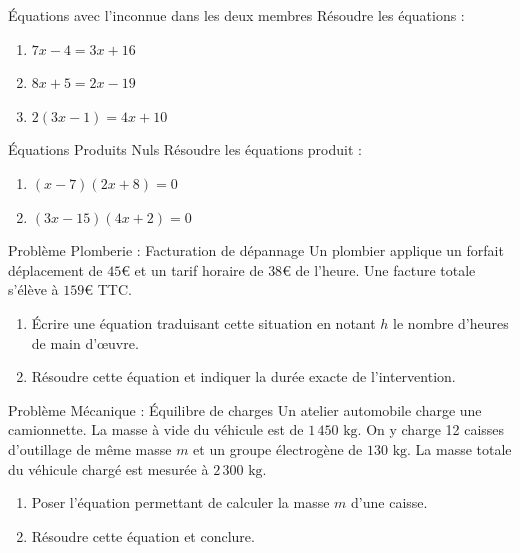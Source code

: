 \begin{exercice}[3 pts]{\capRealiser}{Équations avec l'inconnue dans les deux membres}
Résoudre les équations :
\begin{enumerate}
    \item $7x - 4 = 3x + 16$
    \item $8x + 5 = 2x - 19$
    \item $2(3x - 1) = 4x + 10$
\end{enumerate}
\lignesreponse[6]
\end{exercice}

\begin{exercice}[2 pts]{\capRealiser}{Équations Produits Nuls}
Résoudre les équations produit :
\begin{enumerate}
    \item $(x - 7)(2x + 8) = 0$
    \item $(3x - 15)(4x + 2) = 0$
\end{enumerate}
\lignesreponse[4]
\end{exercice}

\begin{exercice}[3 pts]{\capAnalyser}{Problème Plomberie : Facturation de dépannage}
Un plombier applique un forfait déplacement de $45\euro$ et un tarif horaire de $38\euro$ de l'heure.
Une facture totale s'élève à $159\euro$ TTC.
\begin{enumerate}
    \item Écrire une équation traduisant cette situation en notant $h$ le nombre d'heures de main d'œuvre.
    \item Résoudre cette équation et indiquer la durée exacte de l'intervention.
\end{enumerate}
\lignesreponse[4]
\end{exercice}

\begin{exercice}[3 pts]{\capAnalyser}{Problème Mécanique : Équilibre de charges}
Un atelier automobile charge une camionnette. La masse à vide du véhicule est de $1\,450\text{ kg}$. On y charge 12 caisses d'outillage de même masse $m$ et un groupe électrogène de $130\text{ kg}$.
La masse totale du véhicule chargé est mesurée à $2\,300\text{ kg}$.
\begin{enumerate}
    \item Poser l'équation permettant de calculer la masse $m$ d'une caisse.
    \item Résoudre cette équation et conclure.
\end{enumerate}
\lignesreponse[5]
\end{exercice}

